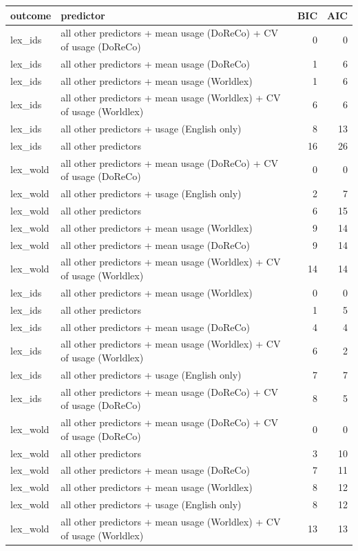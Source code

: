 \begin{table}[ht]
\centering
\begin{tabular}{llrr}
  \hline
outcome & predictor & BIC & AIC \\ 
  \hline
lex\_ids & all other predictors + mean usage (DoReCo) + CV of usage (DoReCo) & 0 & 0 \\ 
  lex\_ids & all other predictors + mean usage (DoReCo) & 1 & 6 \\ 
  lex\_ids & all other predictors + mean usage (Worldlex) & 1 & 6 \\ 
  lex\_ids & all other predictors + mean usage (Worldlex) + CV of usage (Worldlex) & 6 & 6 \\ 
  lex\_ids & all other predictors + usage (English only) & 8 & 13 \\ 
  lex\_ids & all other predictors & 16 & 26 \\ 
  lex\_wold & all other predictors + mean usage (DoReCo) + CV of usage (DoReCo) & 0 & 0 \\ 
  lex\_wold & all other predictors + usage (English only) & 2 & 7 \\ 
  lex\_wold & all other predictors & 6 & 15 \\ 
  lex\_wold & all other predictors + mean usage (Worldlex) & 9 & 14 \\ 
  lex\_wold & all other predictors + mean usage (DoReCo) & 9 & 14 \\ 
  lex\_wold & all other predictors + mean usage (Worldlex) + CV of usage (Worldlex) & 14 & 14 \\ 
  lex\_ids & all other predictors + mean usage (Worldlex) & 0 & 0 \\ 
  lex\_ids & all other predictors & 1 & 5 \\ 
  lex\_ids & all other predictors + mean usage (DoReCo) & 4 & 4 \\ 
  lex\_ids & all other predictors + mean usage (Worldlex) + CV of usage (Worldlex) & 6 & 2 \\ 
  lex\_ids & all other predictors + usage (English only) & 7 & 7 \\ 
  lex\_ids & all other predictors + mean usage (DoReCo) + CV of usage (DoReCo) & 8 & 5 \\ 
  lex\_wold & all other predictors + mean usage (DoReCo) + CV of usage (DoReCo) & 0 & 0 \\ 
  lex\_wold & all other predictors & 3 & 10 \\ 
  lex\_wold & all other predictors + mean usage (DoReCo) & 7 & 11 \\ 
  lex\_wold & all other predictors + mean usage (Worldlex) & 8 & 12 \\ 
  lex\_wold & all other predictors + usage (English only) & 8 & 12 \\ 
  lex\_wold & all other predictors + mean usage (Worldlex) + CV of usage (Worldlex) & 13 & 13 \\ 
   \hline
\end{tabular}
\end{table}
